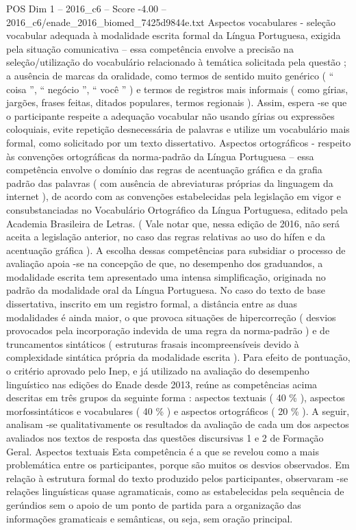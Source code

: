 \begin{textsample}{POS Dim 1 – 2016\_c6 – Score -4.00 – 2016\_c6/enade\_2016\_biomed\_7425d9844e.txt}
Aspectos vocabulares - seleção vocabular adequada à modalidade escrita formal da Língua Portuguesa, exigida pela situação comunicativa – essa competência envolve a precisão na seleção/utilização do vocabulário relacionado à temática solicitada pela questão ; a ausência de marcas da oralidade, como termos de sentido muito genérico ( “ coisa ”, “ negócio ”, “ você ” ) e termos de registros mais informais ( como gírias, jargões, frases feitas, ditados populares, termos regionais ).
Assim, espera -se que o participante respeite a adequação vocabular não usando gírias ou expressões coloquiais, evite repetição desnecessária de palavras e utilize um vocabulário mais formal, como solicitado por um texto dissertativo.
Aspectos ortográficos - respeito às convenções ortográficas da norma-padrão da Língua Portuguesa – essa competência envolve o domínio das regras de acentuação gráfica e da grafia padrão das palavras ( com ausência de abreviaturas próprias da linguagem da internet ), de acordo com as convenções estabelecidas pela legislação em vigor e consubstanciadas no Vocabulário Ortográfico da Língua Portuguesa, editado pela Academia Brasileira de Letras. ( Vale notar que, nessa edição de 2016, não será aceita a legislação anterior, no caso das regras relativas ao uso do hífen e da acentuação gráfica ).
A escolha dessas competências para subsidiar o processo de avaliação apoia -se na concepção de que, no desempenho dos graduandos, a modalidade escrita tem apresentado uma intensa simplificação, originada no padrão da modalidade oral da Língua Portuguesa.
No caso do texto de base dissertativa, inscrito em um registro formal, a distância entre as duas modalidades é ainda maior, o que provoca situações de hipercorreção ( desvios provocados pela incorporação indevida de uma regra da norma-padrão ) e de truncamentos sintáticos ( estruturas frasais incompreensíveis devido à complexidade sintática própria da modalidade escrita ).
Para efeito de pontuação, o critério aprovado pelo Inep, e já utilizado na avaliação do desempenho linguístico nas edições do Enade desde 2013, reúne as competências acima descritas em três grupos da seguinte forma : aspectos textuais ( 40 \% ), aspectos morfossintáticos e vocabulares ( 40 \% ) e aspectos ortográficos ( 20 \% ).
A seguir, analisam -se qualitativamente os resultados da avaliação de cada um dos aspectos avaliados nos textos de resposta das questões discursivas 1 e 2 de Formação Geral.
Aspectos textuais Esta competência é a que se revelou como a mais problemática entre os participantes, porque são muitos os desvios observados.
Em relação à estrutura formal do texto produzido pelos participantes, observaram -se relações linguísticas quase agramaticais, como as estabelecidas pela sequência de gerúndios sem o apoio de um ponto de partida para a organização das informações gramaticais e semânticas, ou seja, sem oração principal.

\end{textsample}
